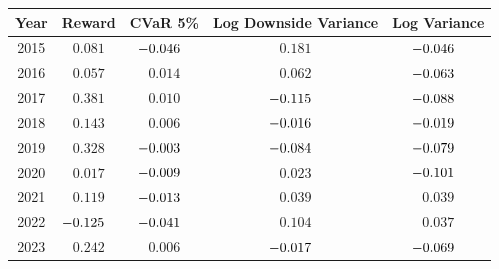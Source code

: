 \begingroup
\footnotesize
\renewcommand{\arraystretch}{1.16}
\setlength{\tabcolsep}{4.5pt}
\begin{tabular}{@{}ccccc@{}}
\toprule
Year & Reward & CVaR 5\% & Log Downside Variance & Log Variance \\
\midrule
2015 & $0.081$ & $\mathllap{-}0.046$ & $0.181$ & $\mathllap{-}0.046$ \\
2016 & $0.057$ & $0.014$ & $0.062$ & $\mathllap{-}0.063$ \\
2017 & $0.381$\sym{***} & $0.010$ & $\mathllap{-}0.115$\sym{**} & $\mathllap{-}0.088$ \\
2018 & $0.143$\sym{*} & $0.006$ & $\mathllap{-}0.016$ & $\mathllap{-}0.019$ \\
2019 & $0.328$\sym{***} & $\mathllap{-}0.003$ & $\mathllap{-}0.084$ & $\mathllap{-}0.079$\sym{*} \\
2020 & $0.017$ & $\mathllap{-}0.009$ & $0.023$ & $\mathllap{-}0.101$ \\
2021 & $0.119$\sym{*} & $\mathllap{-}0.013$ & $0.039$\sym{*} & $0.039$ \\
2022 & $\mathllap{-}0.125$ & $\mathllap{-}0.041$\sym{***} & $0.104$\sym{***} & $0.037$ \\
2023 & $0.242$\sym{***} & $0.006$ & $\mathllap{-}0.017$ & $\mathllap{-}0.069$\sym{**} \\
\bottomrule
\end{tabular}
\endgroup
